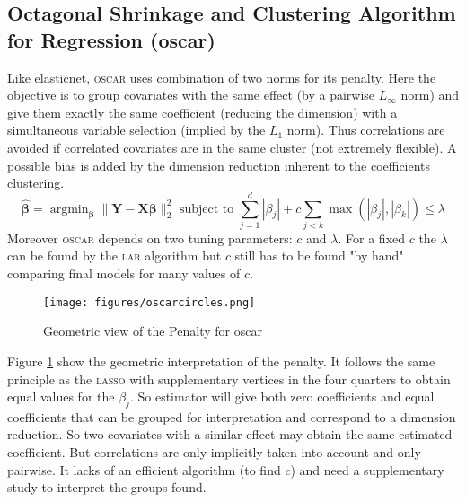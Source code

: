 \documentclass[12pt,a4paper]{report}
\begin{document}
		 \FloatBarrier

		\subsection{Octagonal Shrinkage and Clustering Algorithm for Regression ({\sc oscar})}		%

			Like elasticnet, \textsc{oscar} \cite{bondell2008simultaneous} uses combination of two norms for its penalty. Here the objective is to group covariates with the same effect (by a pairwise $L_\infty$ norm) and give them exactly the same coefficient (reducing the dimension) with a simultaneous variable selection (implied by the $L_1$ norm). Thus correlations are avoided if correlated covariates are in the same cluster (not extremely flexible). A possible bias is added by the dimension reduction inherent to the coefficients clustering.
			\begin{equation}
				\hat{\boldsymbol{\beta}}=\operatorname{argmin}_{\boldsymbol{\beta}} \parallel\boldsymbol{Y}-\boldsymbol{X}\boldsymbol{\beta} \parallel^2_2 \textrm{ subject to } \sum_{j=1}^d|\beta_j|+c\sum_{j<k}\operatorname{max}(|\beta_j|,|\beta_k|) \leq \lambda		 \nonumber 
			\end{equation}						
			Moreover \textsc{oscar} depends on two tuning parameters: $c$ and $\lambda$. For a fixed $c$ the $\lambda$ can be found by the \textsc{lar} algorithm but $c$ still has to be found "by hand" comparing final models for many values of $c$.
			
\begin{figure}[h!]
			\centering
			\texttt{[image: figures/oscarcircles.png]} 
			\caption{Geometric view of the Penalty for {\sc oscar}}\label{oscarcircles}
		\end{figure} 
Figure 	\ref{oscarcircles} show the geometric interpretation of the penalty. It follows the same principle as the \textsc{lasso} with supplementary vertices in the four quarters to obtain equal values for the $\beta_j$. So estimator will give both zero coefficients and equal coefficients that can be grouped for interpretation and correspond to a dimension reduction. So two covariates with a similar effect may obtain the same estimated coefficient. But correlations are only implicitly taken into account and only pairwise. It lacks of an efficient algorithm  (to find $c$) and need a supplementary study to interpret the groups found.
	
\end{document}
